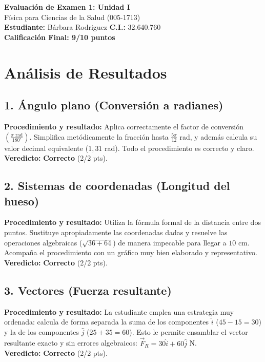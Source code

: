\documentclass[12pt]{article}
\begin{document}
\begin{center}
    \Large \textbf{Evaluación de Examen 1: Unidad I} \\
    \large Física para Ciencias de la Salud (005-1713) \\
    \vspace{0.5cm}
    \textbf{Estudiante:} Bárbara Rodriguez \quad \textbf{C.I.:} 32.640.760
    \vspace{0.3cm} \\
    \large \textbf{Calificación Final: 9/10 puntos}
\end{center}

\vspace{0.5cm}

\section*{Análisis de Resultados}

\subsection*{1. Ángulo plano (Conversión a radianes)}
\textbf{Procedimiento y resultado:} Aplica correctamente el factor de conversión $\left(\frac{\pi \text{ rad}}{180^\circ}\right)$. Simplifica metódicamente la fracción hasta $\frac{5\pi}{12}$ rad, y además calcula su valor decimal equivalente ($1,31$ rad). Todo el procedimiento es correcto y claro. \\
\textbf{Veredicto:} \textbf{Correcto} (2/2 pts).

\subsection*{2. Sistemas de coordenadas (Longitud del hueso)}
\textbf{Procedimiento y resultado:} Utiliza la fórmula formal de la distancia entre dos puntos. Sustituye apropiadamente las coordenadas dadas y resuelve las operaciones algebraicas ($\sqrt{36 + 64}$) de manera impecable para llegar a $10$ cm. Acompaña el procedimiento con un gráfico muy bien elaborado y representativo. \\
\textbf{Veredicto:} \textbf{Correcto} (2/2 pts).

\subsection*{3. Vectores (Fuerza resultante)}
\textbf{Procedimiento y resultado:} La estudiante emplea una estrategia muy ordenada: calcula de forma separada la suma de los componentes $\hat{i}$ ($45 - 15 = 30$) y la de los componentes $\hat{j}$ ($25 + 35 = 60$). Esto le permite ensamblar el vector resultante exacto y sin errores algebraicos: $\vec{F}_R = 30\hat{i} + 60\hat{j}$ N. \\
\textbf{Veredicto:} \textbf{Correcto} (2/2 pts).
\end{document}
